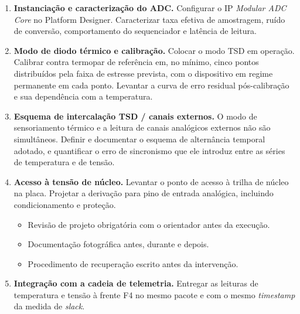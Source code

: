 \documentclass[11pt,a4paper]{article}
\newcommand{\campo}[1]{\vspace{6pt}\noindent{\bfseries\color{lescgray}#1}\par\vspace{2pt}}
\begin{document}
\campo{Tarefas}
\begin{enumerate}
  \item \textbf{Instanciação e caracterização do ADC.}
        Configurar o IP \emph{Modular ADC Core} no Platform Designer. Caracterizar taxa
        efetiva de amostragem, ruído de conversão, comportamento do sequenciador e
        latência de leitura.

  \item \textbf{Modo de diodo térmico e calibração.}
        Colocar o modo TSD em operação. Calibrar contra termopar de referência em, no
        mínimo, cinco pontos distribuídos pela faixa de estresse prevista, com o
        dispositivo em regime permanente em cada ponto. Levantar a curva de erro
        residual pós-calibração e sua dependência com a temperatura.

  \item \textbf{Esquema de intercalação TSD / canais externos.}
        O modo de sensoriamento térmico e a leitura de canais analógicos externos não
        são simultâneos. Definir e documentar o esquema de alternância temporal adotado,
        e quantificar o erro de sincronismo que ele introduz entre as séries de
        temperatura e de tensão.

  \item \textbf{Acesso à tensão de núcleo.}
        Levantar o ponto de acesso à trilha de núcleo na placa. Projetar a derivação
        para pino de entrada analógica, incluindo condicionamento e proteção.
        \begin{itemize}
          \item Revisão de projeto obrigatória com o orientador antes da execução.
          \item Documentação fotográfica antes, durante e depois.
          \item Procedimento de recuperação escrito antes da intervenção.
        \end{itemize}

  \item \textbf{Integração com a cadeia de telemetria.}
        Entregar as leituras de temperatura e tensão à frente F4 no mesmo pacote e com
        o mesmo \emph{timestamp} da medida de \emph{slack}.
\end{enumerate}
\end{document}
